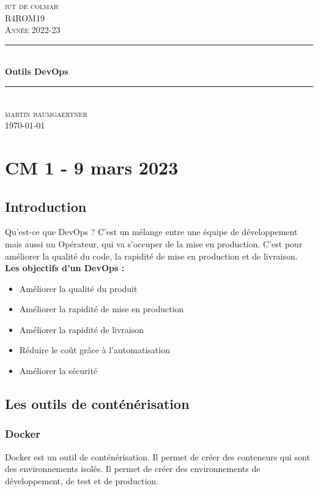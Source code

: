 \documentclass[12pt, a4paper]{article}
\begin{document}
\begin{titlepage}
	\newcommand{\HRule}{\rule{\linewidth}{0.5mm}} 
	\center 
	\textsc{\LARGE iut de colmar}\\[6.5cm] 
	\textsc{\Large R4ROM19}\\[0.5cm] 
	\textsc{\large Année 2022-23}\\[0.5cm]
	\HRule\\[0.75cm]
	{\huge\bfseries Outils DevOps}\\[0.4cm]
	\HRule\\[1.5cm]
	\textsc{\large martin baumgaertner}\\[6.5cm] 

	\vfill\vfill\vfill
	{\large\today} 
	\vfill
\end{titlepage}
\newpage
\tableofcontents
\newpage
\section{CM 1 - 9 mars 2023}
\subsection{Introduction}
Qu'est-ce que DevOps ? C'est un mélange entre une équipe de développement mais 
aussi un Opérateur, qui va s'occuper de la mise en production. C'est pour 
améliorer la qualité du code, la rapidité de mise en production et de livraison.\\ 

\textbf{Les objectifs d'un DevOps :}\\
\begin{itemize}
    \item Améliorer la qualité du produit
    \item Améliorer la rapidité de mise en production
    \item Améliorer la rapidité de livraison
    \item Réduire le coût grâce à l'automatisation
    \item Améliorer la sécurité
\end{itemize}

\subsection{Les outils de conténérisation}
\subsubsection{Docker}
Docker est un outil de conténérisation. Il permet de créer des conteneurs qui
sont des environnements isolés. Il permet de créer des environnements de
développement, de test et de production.\\
\end{document}
